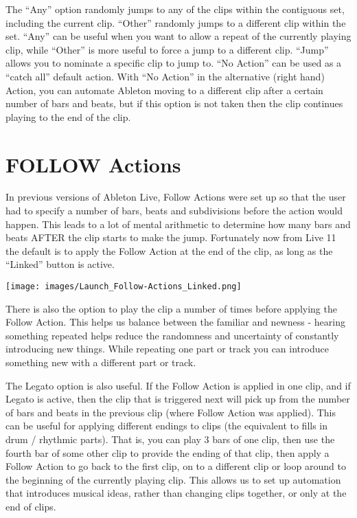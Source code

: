 \documentclass[
  12pt,
  letterpaper,
  oneside,
  open=any]{scrbook}
\begin{document}
The ``Any'' option randomly jumps to any of the clips within the
contiguous set, including the current clip. ``Other'' randomly jumps to
a different clip within the set. ``Any'' can be useful when you want to
allow a repeat of the currently playing clip, while ``Other'' is more
useful to force a jump to a different clip. ``Jump'' allows you to
nominate a specific clip to jump to. ``No Action'' can be used as a
``catch all'' default action. With ``No Action'' in the alternative
(right hand) Action, you can automate Ableton moving to a different clip
after a certain number of bars and beats, but if this option is not
taken then the clip continues playing to the end of the clip.

\section{FOLLOW Actions}\label{follow-actions-1}

In previous versions of Ableton Live, Follow Actions were set up so that
the user had to specify a number of bars, beats and subdivisions before
the action would happen. This leads to a lot of mental arithmetic to
determine how many bars and beats AFTER the clip starts to make the
jump. Fortunately now from Live 11 the default is to apply the Follow
Action at the end of the clip, as long as the ``Linked'' button is
active.

\texttt{[image: images/Launch\_Follow-Actions\_Linked.png]}

There is also the option to play the clip a number of times before
applying the Follow Action. This helps us balance between the familiar
and newness - hearing something repeated helps reduce the randomness and
uncertainty of constantly introducing new things. While repeating one
part or track you can introduce something new with a different part or
track.

The Legato option is also useful. If the Follow Action is applied in one
clip, and if Legato is active, then the clip that is triggered next will
pick up from the number of bars and beats in the previous clip (where
Follow Action was applied). This can be useful for applying different
endings to clips (the equivalent to fills in drum / rhythmic parts).
That is, you can play 3 bars of one clip, then use the fourth bar of
some other clip to provide the ending of that clip, then apply a Follow
Action to go back to the first clip, on to a different clip or loop
around to the beginning of the currently playing clip. This allows us to
set up automation that introduces musical ideas, rather than changing
clips together, or only at the end of clips.
\end{document}
